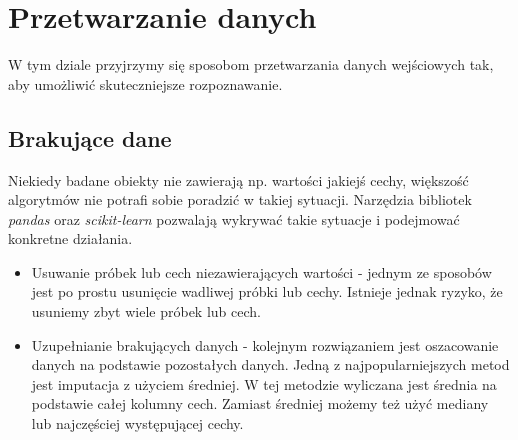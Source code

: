 \documentclass[printmode, eng]{mgr}
\newcommand\tab[1][1cm]{\hspace*{#1}}
\begin{document}
\section{Przetwarzanie danych}
\tab W tym dziale przyjrzymy się sposobom przetwarzania danych wejściowych tak, aby umożliwić skuteczniejsze rozpoznawanie.
\subsection{Brakujące dane}
\tab Niekiedy badane obiekty nie zawierają np. wartości jakiejś cechy, większość algorytmów nie potrafi sobie poradzić w takiej sytuacji. Narzędzia bibliotek \textit{pandas} oraz \textit{scikit-learn} pozwalają wykrywać takie sytuacje i podejmować konkretne działania.
\begin{itemize}
\item Usuwanie próbek lub cech niezawierających wartości - jednym ze sposobów jest po prostu usunięcie wadliwej próbki lub cechy. Istnieje jednak ryzyko, że usuniemy zbyt wiele próbek lub cech.
\item Uzupełnianie brakujących danych - kolejnym rozwiązaniem jest oszacowanie danych na podstawie pozostałych danych. Jedną z najpopularniejszych metod jest imputacja z użyciem średniej. W tej metodzie wyliczana jest średnia na podstawie całej kolumny cech. Zamiast średniej możemy też użyć mediany lub najczęściej występującej cechy.
\end{itemize}
\end{document}
